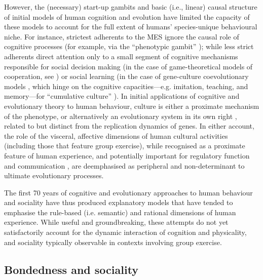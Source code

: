 \begin{CJK}{UTF8}{gbsn}
However, the (necessary) start-up gambits and basic (i.e., linear) causal structure of initial models of human cognition and evolution have limited the capacity of these models to account for the full extent of humans' species-unique behavioural niche.  For instance, strictest adherents to the MES ignore the causal role of cognitive processes (for example, via the ``phenotypic gambit'' \citep{Grafen1984}); while less strict adherents direct attention only to a small segment of cognitive mechanisms responsible for social decision making (in the case of game-theoretical models of cooperation, see \citep{Cosmides1992}) or social learning (in the case of gene-culture coevolutionary models \citep{Henrich2007,Chudek2011}, which hinge on the cognitive capacities---e.g. imitation, teaching, and memory---for ``cumulative culture'' \citep{Tomasello1993}).
In initial applications of cognitive and evolutionary theory to human behaviour, culture is either a proximate mechanism of the phenotype, or alternatively an evolutionary system in its own right \citep{Dawkins1976,Cavalli-Sforza1981}, related to but distinct from the replication dynamics of genes.  In either account, the role of the visceral, affective dimensions of human cultural activities (including those that feature group exercise), while recognised as a proximate feature of human experience, and potentially important for regulatory function \citep{Cosmides2000} and communication \citep{Rime2009}, are deemphasised as peripheral and non-determinant to ultimate evolutionary processes.

The first 70 years of cognitive and evolutionary approaches to human behaviour and sociality have thus produced explanatory models that have tended to emphasise the rule-based (i.e. semantic) and rational dimensions of human experience.  While useful and groundbreaking, these attempts do not yet satisfactorily account for the dynamic interaction of cognition and physicality, and sociality typically observable in contexts involving group exercise.

\subsection{Bondedness and sociality}


\end{CJK}
